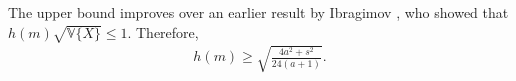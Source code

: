 \documentclass[12pt,reqno,tbtags]{amsart}
\newcommand{\Var}{\mathbb{V}}
\begin{document}
The upper bound improves over an earlier result by Ibragimov \cite{ibragimov1956unimodal}, who showed that $h(m)\sqrt{\Var\{X\}} \le 1$.
Therefore,
\begin{align}\label{Lbound}
h(m) 
\ge 
\sqrt{\frac{4a^2 + s^2}{24(a+1)}}.
\end{align}

\end{document}
